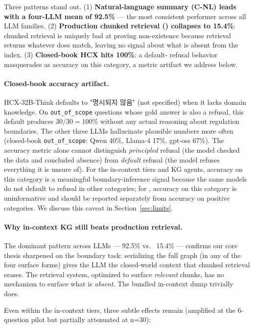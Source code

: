Three patterns stand out. (1) \textbf{Natural-language summary
(C-NL) leads with a four-LLM mean of 92.5\%} — the most consistent
performer across all LLM families. (2) \textbf{Production chunked
retrieval () collapses to 15.4\%}: chunked
retrieval is uniquely bad at proving non-existence because retrieval
returns whatever does match, leaving no signal about what is absent
from the index. (3) \textbf{Closed-book HCX hits 100\%}: a default-
refusal behavior masquerades as accuracy on this category, a
metric artifact we address below.

\paragraph{Closed-book accuracy artifact.}
HCX-32B-Think defaults to "명시되지 않음" (not specified) when it
lacks domain knowledge. On \texttt{out\_of\_scope} questions whose
gold answer is also a refusal, this default produces $30/30 = 100\%$
without any actual reasoning about regulation boundaries. The other
three LLMs hallucinate plausible numbers more often
(closed-book \texttt{out\_of\_scope}: Qwen 40\%, Llama-4 17\%,
gpt-oss 67\%). The accuracy metric alone cannot distinguish
\emph{principled} refusal (the model checked the data and concluded
absence) from \emph{default} refusal (the model refuses everything
it is unsure of). For the in-context tiers and KG agents, accuracy
on this category is a meaningful boundary-inference signal because
the same models do not default to refusal in other categories; for
, accuracy on this category is uninformative
and should be reported separately from accuracy on positive
categories. We discuss this caveat in
Section~\ref{sec:limits}.

\paragraph{Why in-context KG still beats production retrieval.}
The dominant pattern across LLMs —  92.5\% vs.\
 15.4\% — confirms our core thesis sharpened on
the boundary task: serializing the full graph (in any of the four
surface forms) gives the LLM the closed-world context that chunked
retrieval erases. The retrieval system, optimized to surface
\emph{relevant} chunks, has no mechanism to surface what is
\emph{absent}. The bundled in-context dump trivially does.

Even within the in-context tiers, three subtle effects remain
(amplified at the 6-question pilot but partially attenuated at
n=30):

